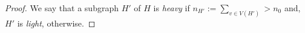 \documentclass[kpfonts]{patmorin}
\theoremstyle{named}
\begin{document}
\begin{proof}

    We say that a subgraph $H'$ of $H$ is \emph{heavy} if
        $n_{H'}:=\sum_{v\in V(H')} > n_0$ and,
    $H'$ is \emph{light}, otherwise.

\end{proof}
\end{document}
